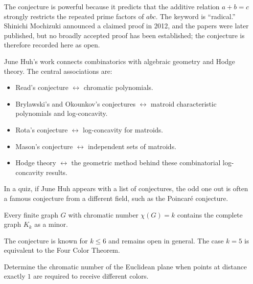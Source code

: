     \begin{remark}
        The conjecture is powerful because it predicts that the additive
        relation $a+b=c$ strongly restricts the repeated prime factors of
        $abc$. The keyword is ``radical.'' Shinichi Mochizuki announced a
        claimed proof in 2012, and the papers were later published, but no
        broadly accepted proof has been established; the conjecture is
        therefore recorded here as open.
    \end{remark}

    \begin{fact}
        June Huh's work connects combinatorics with algebraic geometry and Hodge
        theory. The central associations are:
        \begin{itemize}
            \item Read's conjecture $\leftrightarrow$ chromatic polynomials.
            \item Brylawski's and Okounkov's conjectures
                  $\leftrightarrow$ matroid characteristic polynomials and
                  log-concavity.
            \item Rota's conjecture $\leftrightarrow$ log-concavity for matroids.
            \item Mason's conjecture $\leftrightarrow$ independent sets of matroids.
            \item Hodge theory $\leftrightarrow$ the geometric method behind these
                  combinatorial log-concavity results.
        \end{itemize}
        In a quiz, if June Huh appears with a list of conjectures, the odd one
        out is often a famous conjecture from a different field, such as the
        Poincaré conjecture.
    \end{fact}

    \begin{conjecture}
        Every finite graph $G$ with chromatic number $\chi(G)=k$ contains the
        complete graph $K_k$ as a minor.
    \end{conjecture}

    \begin{remark}
        The conjecture is known for $k\leq 6$ and remains open in general. The
        case $k=5$ is equivalent to the Four Color Theorem.
    \end{remark}

    \begin{openproblem}
        Determine the chromatic number of the Euclidean plane when points at
        distance exactly $1$ are required to receive different colors.
    \end{openproblem}

